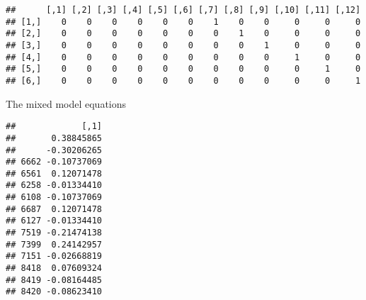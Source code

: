 \documentclass[
]{article}
\newenvironment{Shaded}{\begin{snugshade}}{\end{snugshade}}
\newcommand{\DecValTok}[1]{\textcolor[rgb]{0.00,0.00,0.81}{#1}}
\newcommand{\FunctionTok}[1]{\textcolor[rgb]{0.00,0.00,0.00}{#1}}
\newcommand{\NormalTok}[1]{#1}
\newcommand{\OtherTok}[1]{\textcolor[rgb]{0.56,0.35,0.01}{#1}}
\newcommand{\SpecialCharTok}[1]{\textcolor[rgb]{0.00,0.00,0.00}{#1}}
\begin{document}
\begin{verbatim}
##      [,1] [,2] [,3] [,4] [,5] [,6] [,7] [,8] [,9] [,10] [,11] [,12]
## [1,]    0    0    0    0    0    0    1    0    0     0     0     0
## [2,]    0    0    0    0    0    0    0    1    0     0     0     0
## [3,]    0    0    0    0    0    0    0    0    1     0     0     0
## [4,]    0    0    0    0    0    0    0    0    0     1     0     0
## [5,]    0    0    0    0    0    0    0    0    0     0     1     0
## [6,]    0    0    0    0    0    0    0    0    0     0     0     1
\end{verbatim}

The mixed model equations

\begin{Shaded}
\end{Shaded}

\begin{verbatim}
##             [,1]
##       0.38845865
##      -0.30206265
## 6662 -0.10737069
## 6561  0.12071478
## 6258 -0.01334410
## 6108 -0.10737069
## 6687  0.12071478
## 6127 -0.01334410
## 7519 -0.21474138
## 7399  0.24142957
## 7151 -0.02668819
## 8418  0.07609324
## 8419 -0.08164485
## 8420 -0.08623410
\end{verbatim}
\end{document}
